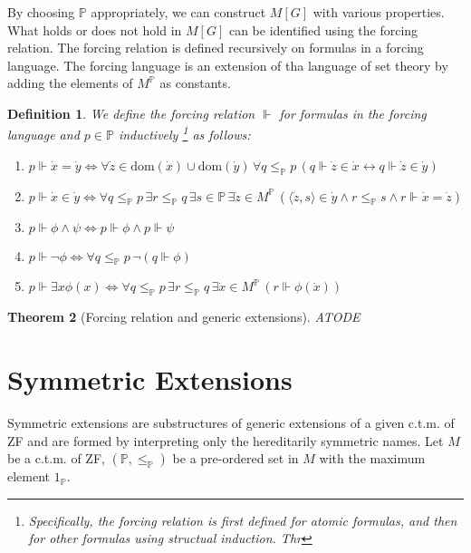 \documentclass{report}
\newtheorem{thm}{Theorem}[chapter]
\newtheorem{dfn}[thm]{Definition}
\newcommand{\Pbb}{\mathbb{P}}
\begin{document}
By choosing $\Pbb$ appropriately, we can construct $M[G]$ with various properties.
What holds or does not hold in $M[G]$ can be identified using the forcing relation.
The forcing relation is defined recursively on formulas in a forcing language.
The forcing language is an extension of tha language of set theory by adding the elements of $M^{\Pbb}$ as constants.
\begin{dfn} %
  We define the \emph{forcing relation} $\Vdash$ for formulas in the forcing language and $p \in \Pbb$ inductively
  \footnote{
    Specifically, the forcing relation is first defined for atomic formulas, and then for other formulas using structual induction. 
    Thr 
  
  }
  as follows:
  \begin{enumerate}
    \item $p \Vdash \dot{x} = \dot{y} \Leftrightarrow \forall \dot{z} \in \text{dom}(\dot{x}) \cup \text{dom}(\dot{y})\,
\forall q \leq_{\Pbb} p \, (q \Vdash \dot{z} \in \dot{x} \leftrightarrow q \Vdash \dot{z} \in \dot{y})$
    \item $p \Vdash \dot{x} \in \dot{y} \Leftrightarrow \forall q \leq_{\Pbb} p\, \exists r \leq_{\Pbb} q \, 
    \exists s \in \Pbb \, \exists \dot{z} \in M^{\Pbb} \, (\langle \dot{z}, s \rangle \in \dot{y} \land r \leq_{\Pbb} s \land r \Vdash \dot{x} = \dot{z} )$
    \item $p \Vdash \phi \land \psi \Leftrightarrow p \Vdash \phi \land p \Vdash \psi$
    \item $p \Vdash \neg \phi \Leftrightarrow \forall q \leq_{\Pbb} p \, \neg (q \Vdash \phi)$
    \item $p \Vdash \exists x \phi(x) \Leftrightarrow \forall q \leq_{\Pbb} p \, \exists r \leq_{\Pbb} q \, \exists \dot{x} \in M^{\Pbb} \, (r \Vdash \phi(\dot{x}))$
  \end{enumerate}
\end{dfn}

\begin{thm} [Forcing relation and generic extensions]
  ATODE
\end{thm}

\section{Symmetric Extensions}
Symmetric extensions are substructures of generic extensions of a given c.t.m. of ZF 
and are formed by interpreting only the hereditarily symmetric names.
Let $M$ be a c.t.m. of ZF, $(\Pbb, \leq_{\Pbb})$ be a pre-ordered set in $M$ with the maximum element $1_{\Pbb}$.
\end{document}
